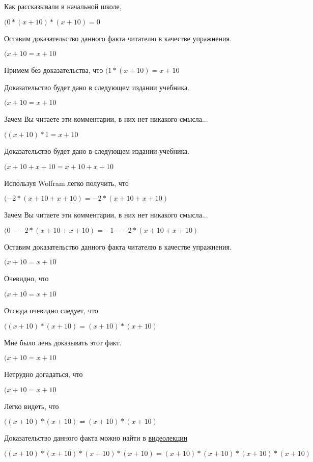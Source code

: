 \documentclass[12pt,a4paper,fleqn]{article}
\theoremstyle{definition}
\begin{document}
Как рассказывали в начальной школе,

$( 0  * ( x  +  10 ) * ( x  +  10 ) =  0 $

Оставим доказательство данного факта читателю в качестве упражнения.

$( x  +  10  =  x  +  10 $

Примем без доказательства, что
$( 1  * ( x  +  10 ) =  x  +  10 $

Доказательство будет дано в следующем издании учебника.

$( x  +  10  =  x  +  10 $

Зачем Вы читаете эти комментарии, в них нет никакого смысла...

$(( x  +  10 ) *  1  =  x  +  10 $

Доказательство будет дано в следующем издании учебника.

$( x  +  10  +  x  +  10  =  x  +  10  +  x  +  10 $

Используя Wolfram легко получить, что

$( -2  * ( x  +  10  +  x  +  10 ) =  -2  * ( x  +  10  +  x  +  10 )$

Зачем Вы читаете эти комментарии, в них нет никакого смысла...

$( 0  -  -2  * ( x  +  10  +  x  +  10 ) =  -1  -  -2  * ( x  +  10  +  x  +  10 )$

Оставим доказательство данного факта читателю в качестве упражнения.

$( x  +  10  =  x  +  10 $

Очевидно, что

$( x  +  10  =  x  +  10 $

Отсюда очевидно следует, что

$(( x  +  10 ) * ( x  +  10 ) = ( x  +  10 ) * ( x  +  10 )$

Мне было лень доказывать этот факт.

$( x  +  10  =  x  +  10 $

Нетрудно догадаться, что

$( x  +  10  =  x  +  10 $

Легко видеть, что

$(( x  +  10 ) * ( x  +  10 ) = ( x  +  10 ) * ( x  +  10 )$

Доказательство данного факта можно найти в \href{https://www.youtube.com/watch?v=dQw4w9WgXcQ}{видеолекции}

$(( x  +  10 ) * ( x  +  10 ) * ( x  +  10 ) * ( x  +  10 ) = ( x  +  10 ) * ( x  +  10 ) * ( x  +  10 ) * ( x  +  10 )$
\end{document}
